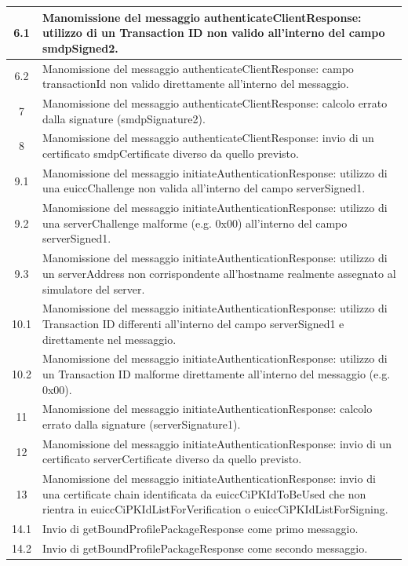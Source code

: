 \documentclass[10pt, oneside]{book}
\begin{document}
\begin{table}[h!]
\begin{center}
\begin{tabularx}{\textwidth}{|c|X|}
\hline
6.1 & Manomissione del messaggio authenticateClientResponse: utilizzo di un Transaction ID non valido all'interno del campo smdpSigned2.\\
\hline
6.2 & Manomissione del messaggio authenticateClientResponse: campo transactionId non valido direttamente all'interno del messaggio.\\
\hline
7 & Manomissione del messaggio authenticateClientResponse:  calcolo errato dalla signature (smdpSignature2).\\
\hline
8 & Manomissione del messaggio authenticateClientResponse: invio di un certificato smdpCertificate diverso da quello previsto.\\
\hline
9.1 & Manomissione del messaggio initiateAuthenticationResponse: utilizzo di una euiccChallenge non valida all'interno del campo serverSigned1.\\
\hline
9.2 & Manomissione del messaggio initiateAuthenticationResponse: utilizzo di una serverChallenge malforme (e.g. 0x00) all'interno del campo serverSigned1.\\
\hline
9.3 & Manomissione del messaggio initiateAuthenticationResponse: utilizzo di un serverAddress non corrispondente all'hostname realmente assegnato al simulatore del server.\\
\hline
10.1 & Manomissione del messaggio initiateAuthenticationResponse: utilizzo di Transaction ID differenti all'interno del campo serverSigned1 e direttamente nel messaggio.\\
\hline
10.2 & Manomissione del messaggio initiateAuthenticationResponse: utilizzo di un Transaction ID malforme direttamente all'interno del messaggio (e.g. 0x00).\\
\hline
11 & Manomissione del messaggio initiateAuthenticationResponse: calcolo errato dalla signature (serverSignature1).\\
\hline
12 & Manomissione del messaggio initiateAuthenticationResponse: invio di un certificato serverCertificate diverso da quello previsto.\\
\hline
13 & Manomissione del messaggio initiateAuthenticationResponse: invio di una certificate chain identificata da euiccCiPKIdToBeUsed che non rientra in euiccCiPKIdListForVerification o euiccCiPKIdListForSigning.\\
\hline
14.1 & Invio di getBoundProfilePackageResponse come primo messaggio.\\
\hline
14.2 & Invio di getBoundProfilePackageResponse come secondo messaggio.\\
\hline
\end{tabularx}
\end{center}
\end{table}
\end{document}
